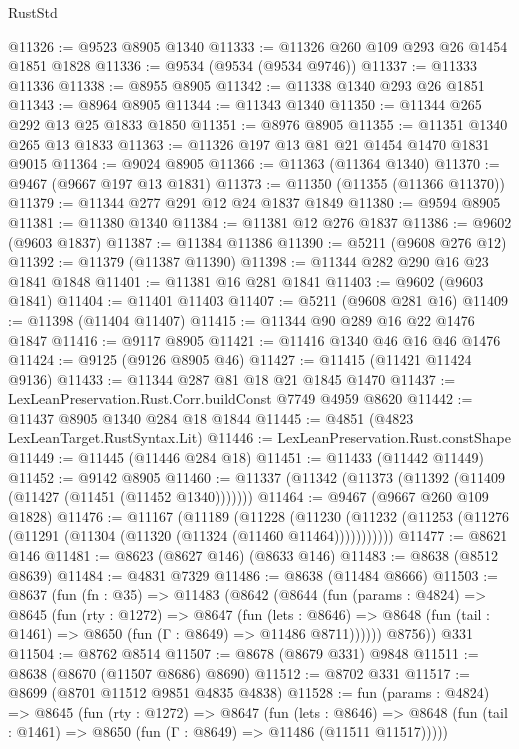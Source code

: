 \begin{lexlean}{RustStd}
\begin{coremodule}
@11326 := @9523 @8905 @1340
@11333 := @11326 @260 @109 @293 @26 @1454 @1851 @1828
@11336 := @9534 (@9534 (@9534 @9746))
@11337 := @11333 @11336
@11338 := @8955 @8905
@11342 := @11338 @1340 @293 @26 @1851
@11343 := @8964 @8905
@11344 := @11343 @1340
@11350 := @11344 @265 @292 @13 @25 @1833 @1850
@11351 := @8976 @8905
@11355 := @11351 @1340 @265 @13 @1833
@11363 := @11326 @197 @13 @81 @21 @1454 @1470 @1831 @9015
@11364 := @9024 @8905
@11366 := @11363 (@11364 @1340)
@11370 := @9467 (@9667 @197 @13 @1831)
@11373 := @11350 (@11355 (@11366 @11370))
@11379 := @11344 @277 @291 @12 @24 @1837 @1849
@11380 := @9594 @8905
@11381 := @11380 @1340
@11384 := @11381 @12 @276 @1837
@11386 := @9602 (@9603 @1837)
@11387 := @11384 @11386
@11390 := @5211 (@9608 @276 @12)
@11392 := @11379 (@11387 @11390)
@11398 := @11344 @282 @290 @16 @23 @1841 @1848
@11401 := @11381 @16 @281 @1841
@11403 := @9602 (@9603 @1841)
@11404 := @11401 @11403
@11407 := @5211 (@9608 @281 @16)
@11409 := @11398 (@11404 @11407)
@11415 := @11344 @90 @289 @16 @22 @1476 @1847
@11416 := @9117 @8905
@11421 := @11416 @1340 @46 @16 @46 @1476
@11424 := @9125 (@9126 @8905 @46)
@11427 := @11415 (@11421 @11424 @9136)
@11433 := @11344 @287 @81 @18 @21 @1845 @1470
@11437 := LexLeanPreservation.Rust.Corr.buildConst @7749 @4959 @8620
@11442 := @11437 @8905 @1340 @284 @18 @1844
@11445 := @4851 (@4823 LexLeanTarget.RustSyntax.Lit)
@11446 := LexLeanPreservation.Rust.constShape
@11449 := @11445 (@11446 @284 @18)
@11451 := @11433 (@11442 @11449)
@11452 := @9142 @8905
@11460 := @11337 (@11342 (@11373 (@11392 (@11409 (@11427 (@11451 (@11452 @1340)))))))
@11464 := @9467 (@9667 @260 @109 @1828)
@11476 := @11167
    (@11189
      (@11228
        (@11230 (@11232 (@11253 (@11276 (@11291 (@11304 (@11320 (@11324 (@11460 @11464)))))))))))
@11477 := @8621 @146
@11481 := @8623 (@8627 @146) (@8633 @146)
@11483 := @8638 (@8512 @8639)
@11484 := @4831 @7329
@11486 := @8638 (@11484 @8666)
@11503 := @8637
    (fun (fn : @35) =>
    @11483
      (@8642
        (@8644
          (fun (params : @4824) =>
          @8645
            (fun (rty : @1272) =>
            @8647
              (fun (lets : @8646) =>
              @8648 (fun (tail : @1461) => @8650 (fun (Γ : @8649) => @11486 @8711))))))
        @8756))
    @331
@11504 := @8762 @8514
@11507 := @8678 (@8679 @331) @9848
@11511 := @8638 (@8670 (@11507 @8686) @8690)
@11512 := @8702 @331
@11517 := @8699 (@8701 @11512 @9851 @4835 @4838)
@11528 := fun (params : @4824) =>
  @8645
    (fun (rty : @1272) =>
    @8647
      (fun (lets : @8646) =>
      @8648 (fun (tail : @1461) => @8650 (fun (Γ : @8649) => @11486 (@11511 @11517)))))

\end{coremodule}
\end{lexlean}
